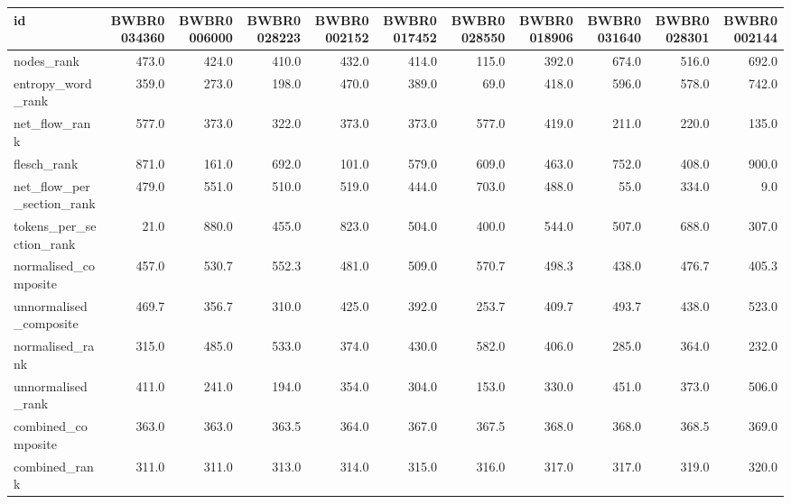 \begin{tabular}{lrrrrrrrrrr}
\toprule
id & BWBR0034360 & BWBR0006000 & BWBR0028223 & BWBR0002152 & BWBR0017452 & BWBR0028550 & BWBR0018906 & BWBR0031640 & BWBR0028301 & BWBR0002144 \\
\midrule
nodes\_rank & 473.0 & 424.0 & 410.0 & 432.0 & 414.0 & 115.0 & 392.0 & 674.0 & 516.0 & 692.0 \\
\cline{1-11}
entropy\_word\_rank & 359.0 & 273.0 & 198.0 & 470.0 & 389.0 & 69.0 & 418.0 & 596.0 & 578.0 & 742.0 \\
\cline{1-11}
net\_flow\_rank & 577.0 & 373.0 & 322.0 & 373.0 & 373.0 & 577.0 & 419.0 & 211.0 & 220.0 & 135.0 \\
\cline{1-11}
flesch\_rank & 871.0 & 161.0 & 692.0 & 101.0 & 579.0 & 609.0 & 463.0 & 752.0 & 408.0 & 900.0 \\
\cline{1-11}
net\_flow\_per\_section\_rank & 479.0 & 551.0 & 510.0 & 519.0 & 444.0 & 703.0 & 488.0 & 55.0 & 334.0 & 9.0 \\
\cline{1-11}
tokens\_per\_section\_rank & 21.0 & 880.0 & 455.0 & 823.0 & 504.0 & 400.0 & 544.0 & 507.0 & 688.0 & 307.0 \\
\cline{1-11}
normalised\_composite & 457.0 & 530.7 & 552.3 & 481.0 & 509.0 & 570.7 & 498.3 & 438.0 & 476.7 & 405.3 \\
\cline{1-11}
unnormalised\_composite & 469.7 & 356.7 & 310.0 & 425.0 & 392.0 & 253.7 & 409.7 & 493.7 & 438.0 & 523.0 \\
\cline{1-11}
normalised\_rank & 315.0 & 485.0 & 533.0 & 374.0 & 430.0 & 582.0 & 406.0 & 285.0 & 364.0 & 232.0 \\
\cline{1-11}
unnormalised\_rank & 411.0 & 241.0 & 194.0 & 354.0 & 304.0 & 153.0 & 330.0 & 451.0 & 373.0 & 506.0 \\
\cline{1-11}
combined\_composite & 363.0 & 363.0 & 363.5 & 364.0 & 367.0 & 367.5 & 368.0 & 368.0 & 368.5 & 369.0 \\
\cline{1-11}
combined\_rank & 311.0 & 311.0 & 313.0 & 314.0 & 315.0 & 316.0 & 317.0 & 317.0 & 319.0 & 320.0 \\
\cline{1-11}
\bottomrule
\end{tabular}

